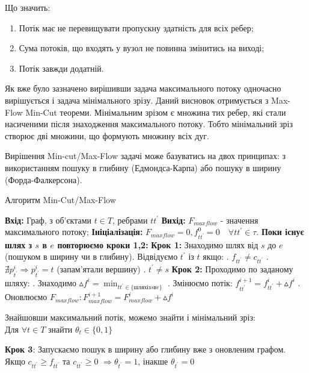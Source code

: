 Що значить:
\begin{enumerate}
    \item Потік має не перевищувати пропускну здатність для всіх ребер;
    \item Сума потоків, що входять у вузол не повинна змінитись на виході;
    \item Потік завжди додатній.
\end{enumerate}

Як вже було зазначено вирішивши задача максимального потоку одночасно вирішується і задача
мінімального зрізу. Даний висновок отримується з Max-Flow Min-Cut теореми.
Мінімальним зрізом є множина тих ребер, які стали насиченими після знаходження максимального
потоку. Тобто мінімальний зріз створює дві множини, що формують множину всіх дуг.



Вирішення Min-cut/Max-Flow задачі може базуватись на двох принципах:
з використанням пошуку в глибину (Едмондса-Карпа) або пошуку в ширину (Форда-Фалкерсона).

\begin{algorithm}[H]
    \caption{Алгоритм Min-Cut/Max-Flow}
    \begin{algorithmic}
        \State \textbf{Вхід:} Граф, з об'єктами $ t \in T $, ребрами $tt^{'} $
        \State \textbf{Вихід:} $ F_{maxflow} $ - значення максимального потоку;
        \State \textbf{Ініціалізація:} $ F_{maxflow} = 0, f_{tt^{'}}^{0} = 0 \quad \forall tt^{'}  \in \tau $.
        \State \textbf{Поки існує шлях з $s$ в $e$ повторюємо кроки 1,2:}
        \State \textbf{Крок 1:} Знаходимо шлях від $s$ до $e$ (пошуком в ширину чи в глибину).
        \State Відвідуємо $ t^{'}$ із $t $ якщо:
        \State {}. $ f_{tt^{'}} \neq c_{tt^{'}} $
        \State {}. $ \nexists p_{t^{'}}^{i} \Rightarrow p_{t^{'}}^{i} = t $ (запам'ятали вершину)
        \State {}. $ t^{'} \neq s $
        \State \textbf{Крок 2:} Проходимо по заданому шляху:
        \State {}. Знаходимо $ \vartriangle f^{i} = \min_{tt^{'} \in \{шлях із s в e \}} $
        \State {}. Змінюємо потік: $ f_{tt^{'}}^{i+1} = f_{tt^{'}}^{i} + \vartriangle f^{i} $
        \State {}. Оновлюємо $ F_{maxflow}: F_{maxflow}^{i+1} = F_{maxflow}^{i} + \vartriangle f^{i} $
    \end{algorithmic}

    Знайшовши максимальний потік, можемо знайти і мінімальний зріз: \\
    Для $\forall t \in T$ знайти $\theta_{t} \in \{0,1\}$
    \begin{algorithmic}
        \State \textbf{Крок 3}: Запускаємо пошук в ширину або глибину вже з оновленим графом.
        \State \qquad Якщо $c_{tt^{'}} \geqslant f_{tt^{'}}$ та $c_{tt^{'}} \geqslant 0$
        $\Rightarrow \theta_{t^{'}} = 1 $, інакше $\theta_{t^{'}} = 0 $
    \end{algorithmic}
\end{algorithm}

